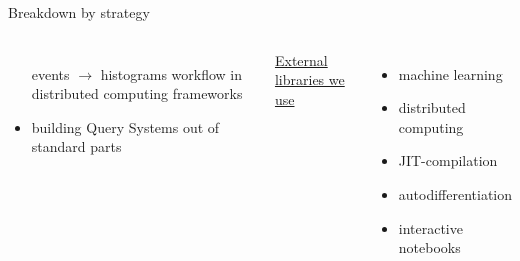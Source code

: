 \documentclass[aspectratio=169]{beamer}
\begin{document}
\begin{frame}{Breakdown by strategy}
\begin{columns}[t]
\begin{itemize}
events $\to$ histograms workflow in distributed computing frameworks
\item building Query Systems out of standard parts
\end{itemize}

\underline{\large External libraries we use}

\vspace{0.15 cm}
\begin{itemize}
\item machine learning
\item distributed computing
\item JIT-compilation
\item autodifferentiation
\item interactive notebooks
\end{itemize}

\end{columns}
\end{frame}
\end{document}
